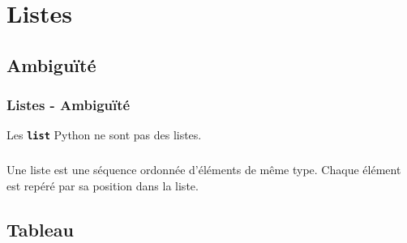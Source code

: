 \documentclass[svgnames,11pt]{beamer}
\begin{document}
\section{Listes}
\subsection{Ambiguïté}
\begin{frame}
    \frametitle{Listes - Ambiguïté}


    \begin{aretenir}[Observation]
        \centering Les \textbf{\texttt{list}} Python ne sont pas des listes.
    \end{aretenir}
\end{frame}
\begin{frame}
    \frametitle{}

    \begin{aretenir}[Définition]
        \centering Une liste est une séquence ordonnée d'éléments de même type. Chaque élément est repéré par sa position dans la liste.
    \end{aretenir}

\end{frame}
\subsection{Tableau}
\end{document}
